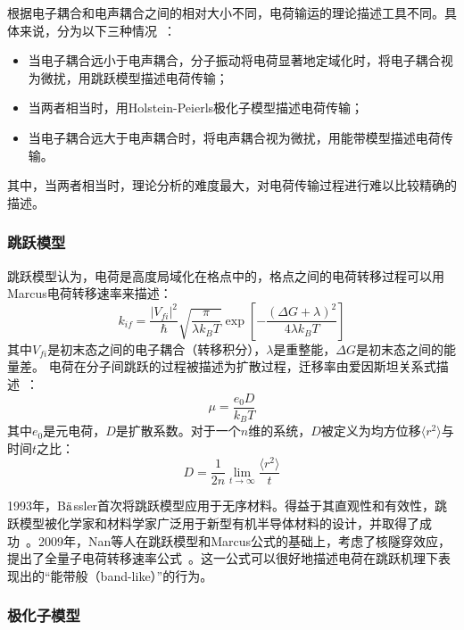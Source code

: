 \documentclass{article}
\begin{document}
根据电子耦合和电声耦合之间的相对大小不同，电荷输运的理论描述工具不同。具体来说，分为以下三种情况~\cite{SHUAI12,SHUAI11}：
\begin{itemize}
    \item 当电子耦合远小于电声耦合，分子振动将电荷显著地定域化时，将电子耦合视为微扰，用跳跃模型描述电荷传输；
    \item 当两者相当时，用Holstein-Peierls极化子模型描述电荷传输；
    \item 当电子耦合远大于电声耦合时，将电声耦合视为微扰，用能带模型描述电荷传输。
\end{itemize}
其中，当两者相当时，理论分析的难度最大，对电荷传输过程进行难以比较精确的描述。

\subsubsection{跳跃模型}

跳跃模型认为，电荷是高度局域化在格点中的，格点之间的电荷转移过程可以用Marcus电荷转移速率来描述：
\begin{equation}
\label{eq:intro-mcs}
k_{if}=\frac{|V_{fi}|^2}{\hbar}\sqrt{\frac{\pi}{\lambda k_BT}}\exp\left[-\frac{\left(\Delta G+\lambda \right )^2}{4\lambda k_BT} \right ]
\end{equation}
其中$V_{fi}$是初末态之间的电子耦合（转移积分），$\lambda$是重整能，$\Delta G$是初末态之间的能量差。
电荷在分子间跳跃的过程被描述为扩散过程，迁移率由爱因斯坦关系式描述~\cite{SCHEIN79}：
\begin{equation}
\label{eq:hopping-einstein}
\mu=\frac{e_0D}{k_BT}
\end{equation}
其中$e_0$是元电荷，$D$是扩散系数。对于一个$n$维的系统，$D$被定义为均方位移$\langle r^2 \rangle$与时间$t$之比：
\begin{equation}
\label{eq:hopping-diffusion}
D=\frac{1}{2n}\lim_{t\rightarrow \infty }\frac{\langle r^2 \rangle}{t}
\end{equation}

1993年，B$\ddot{\rm a}$ssler首次将跳跃模型应用于无序材料。得益于其直观性和有效性，跳跃模型被化学家和材料学家广泛用于新型有机半导体材料的设计，并取得了成功~\cite{SHUAI14,SOKO11}。2009年，Nan等人在跳跃模型和Marcus公式的基础上，考虑了核隧穿效应，提出了全量子电荷转移速率公式~\cite{NAN09}。这一公式可以很好地描述电荷在跳跃机理下表现出的“能带般（band-like）”的行为。

\subsubsection{极化子模型}
\end{document}

